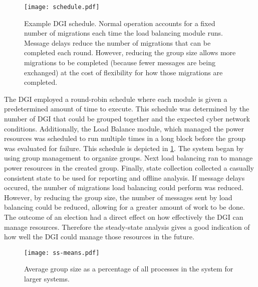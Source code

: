 \begin{figure}
    \centering
    \texttt{[image: schedule.pdf]}
    \caption{Example DGI schedule. Normal operation accounts for a fixed number of migrations each time the load balancing module runs. Message delays reduce the number of migrations that can be completed each round. However, reducing the group size allows more migrations to be completed (because fewer messages are being exchanged) at the cost of flexibility for how those migrations are completed.}
    \label{fig:schedule}
\end{figure}

The DGI employed a round-robin schedule where each module is given a predetermined amount of time to execute.
This schedule was determined by the number of DGI that could be grouped together and the expected cyber network conditions.
Additionally, the Load Balance module, which managed the power resources was scheduled to run multiple times in a long block before the group was evaluated for failure.
This schedule is depicted in \ref{fig:schedule}.
The system began by using group management to organize groups.
Next load balancing ran to manage power resources in the created group.
Finally, state collection collected a casually consistent state to be used for reporting and offline analysis.
If message delays occured, the number of migrations load balancing could perform was reduced.
However, by reducing the group size, the number of messages sent by load balancing could be reduced, allowing for a greater amount of work to be done.
The outcome of an election had a direct effect on how effectively the DGI can manage resources.
Therefore the steady-state analysis gives a good indication of how well the DGI could manage those resources in the future.

\begin{figure}
    \centering
    \texttt{[image: ss-means.pdf]}
    \caption{Average group size as a percentage of all processes in the system for larger systems.}
    \label{fig:ss-means}
\end{figure}

